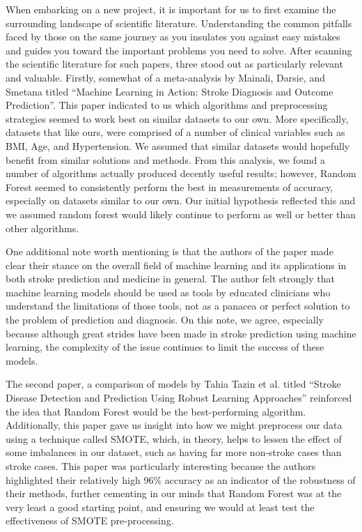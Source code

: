 \documentclass[11pt]{article}
\begin{document}
When embarking on a new project, it is important for us to first examine the surrounding landscape of scientific literature. Understanding the common pitfalls faced by those on the same journey as you insulates you against easy mistakes and guides you toward the important problems you need to solve. After scanning the scientific literature for such papers, three stood out as particularly relevant and valuable. Firstly, somewhat of a meta-analysis by Mainali, Darsie, and Smetana titled “Machine Learning in Action: Stroke Diagnosis and Outcome Prediction”. This paper indicated to us which algorithms and preprocessing strategies seemed to work best on similar datasets to our own. More specifically, datasets that like ours, were comprised of a number of clinical variables such as BMI, Age, and Hypertension. We assumed that similar datasets would hopefully benefit from similar solutions and methods. From this analysis, we found a number of algorithms actually produced decently useful results; however, Random Forest seemed to consistently perform the best in measurements of accuracy, especially on datasets similar to our own. Our initial hypothesis reflected this and we assumed random forest would likely continue to perform as well or better than other algorithms.

\medskip

One additional note worth mentioning is that the authors of the paper made clear their stance on the overall field of machine learning and its applications in both stroke prediction and medicine in general. The author felt strongly that machine learning models should be used as tools by educated clinicians who understand the limitations of those tools, not as a panacea or perfect solution to the problem of prediction and diagnosis. On this note, we agree, especially because although great strides have been made in stroke prediction using machine learning, the complexity of the issue continues to limit the success of these models.

\medskip
The second paper, a comparison of models by Tahia Tazin et al. titled “Stroke Disease Detection and Prediction Using Robust Learning Approaches” reinforced the idea that Random Forest would be the best-performing algorithm. Additionally, this paper gave us insight into how we might preprocess our data using a technique called SMOTE, which, in theory, helps to lessen the effect of some imbalances in our dataset, such as having far more non-stroke cases than stroke cases. This paper was particularly interesting because the authors highlighted their relatively high 96\% accuracy as an indicator of the robustness of their methods, further cementing in our minds that Random Forest was at the very least a good starting point, and ensuring we would at least test the effectiveness of SMOTE pre-processing.
\end{document}
